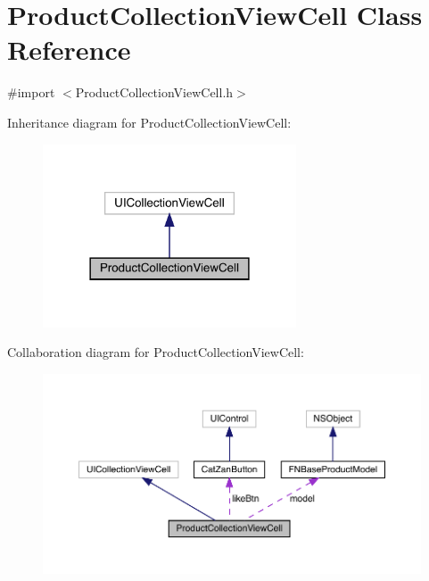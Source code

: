 \hypertarget{interface_product_collection_view_cell}{}\section{Product\+Collection\+View\+Cell Class Reference}
\label{interface_product_collection_view_cell}


{\ttfamily \#import $<$Product\+Collection\+View\+Cell.\+h$>$}



Inheritance diagram for Product\+Collection\+View\+Cell\+:\nopagebreak
\begin{figure}[H]
\begin{center}
\leavevmode
\includegraphics[width=213pt]{interface_product_collection_view_cell__inherit__graph}
\end{center}
\end{figure}


Collaboration diagram for Product\+Collection\+View\+Cell\+:\nopagebreak
\begin{figure}[H]
\begin{center}
\leavevmode
\includegraphics[width=350pt]{interface_product_collection_view_cell__coll__graph}
\end{center}
\end{figure}
